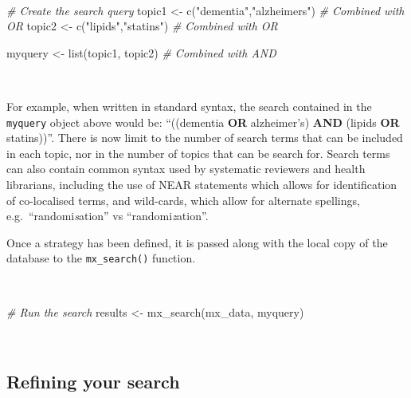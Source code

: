 \documentclass[a4paper, twoside]{templates/ociamthesis}
\newenvironment{Shaded}{\begin{snugshade}}{\end{snugshade}}
\newcommand{\CommentTok}[1]{\textcolor[rgb]{0.56,0.35,0.01}{\textit{#1}}}
\newcommand{\FunctionTok}[1]{\textcolor[rgb]{0.00,0.00,0.00}{#1}}
\newcommand{\NormalTok}[1]{#1}
\newcommand{\OtherTok}[1]{\textcolor[rgb]{0.56,0.35,0.01}{#1}}
\newcommand{\StringTok}[1]{\textcolor[rgb]{0.31,0.60,0.02}{#1}}
\renewenvironment{Shaded}
{
  \vspace{4pt}%
  \begin{snugshade}%
}{%
  \end{snugshade}%
  \vspace{4pt}%
}
\begin{document}
~

\begin{Shaded}
\begin{Highlighting}[]
\CommentTok{\# Create the search query}
\NormalTok{topic1  }\OtherTok{\textless{}{-}} \FunctionTok{c}\NormalTok{(}\StringTok{"dementia"}\NormalTok{,}\StringTok{"alzheimer\textquotesingle{}s"}\NormalTok{)  }\CommentTok{\# Combined with OR}
\NormalTok{topic2  }\OtherTok{\textless{}{-}} \FunctionTok{c}\NormalTok{(}\StringTok{"lipids"}\NormalTok{,}\StringTok{"statins"}\NormalTok{)        }\CommentTok{\# Combined with OR}

\NormalTok{myquery }\OtherTok{\textless{}{-}} \FunctionTok{list}\NormalTok{(topic1, topic2)         }\CommentTok{\# Combined with AND}
\end{Highlighting}
\end{Shaded}

~

For example, when written in standard syntax, the search contained in the \texttt{myquery} object above would be: ``((dementia \textbf{OR} alzheimer's) \textbf{AND} (lipids \textbf{OR} statins))''. There is now limit to the number of search terms that can be included in each topic, nor in the number of topics that can be search for. Search terms can also contain common syntax used by systematic reviewers and health librarians, including the use of NEAR statements which allows for identification of co-localised terms, and wild-cards, which allow for alternate spellings, e.g.~``randomi\emph{s}ation'' vs ``randomi\emph{z}ation''.

Once a strategy has been defined, it is passed along with the local copy of the database to the \texttt{mx\_search()} function.

~

\begin{Shaded}
\begin{Highlighting}[]
\CommentTok{\# Run the search}
\NormalTok{results }\OtherTok{\textless{}{-}} \FunctionTok{mx\_search}\NormalTok{(mx\_data,}
\NormalTok{                     myquery)}
\end{Highlighting}
\end{Shaded}

~

\hypertarget{refining-your-search}{%
\subsection{Refining your search}\label{refining-your-search}}
\end{document}
